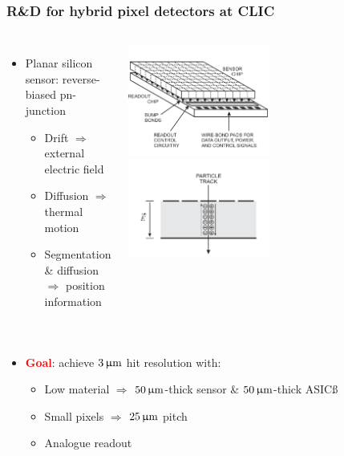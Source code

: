 \begin{frame}
  \frametitle{R\&D for hybrid pixel detectors at CLIC}


  \begin{columns}
    \begin{itemize}
    \item Planar silicon sensor: reverse-biased pn-junction
      \begin{itemize}
      \item Drift $\Rightarrow$ external electric field
      \item Diffusion $\Rightarrow$ thermal motion
      \item Segmentation \& diffusion $\Rightarrow$ position
        information
      \end{itemize}
    \end{itemize}
    \centering
    \includegraphics[width=0.5\textwidth]{figures/hybridDet.pdf}~
    \includegraphics[width=0.5\textwidth]{figures/drift_sensor.pdf}
  \end{columns}



  \begin{columns}
    \begin{itemize}
    \item \textcolor{Red}{\textbf{Goal}}: achieve $3\,\upmu\mathrm{m}$ hit resolution with:
      \begin{itemize}
      \item Low material $\Rightarrow$ $50\,\upmu\mathrm{m}$-thick sensor \& $50\,\upmu\mathrm{m}$-thick ASICß
      \item Small pixels $\Rightarrow$ $25\,\upmu\mathrm{m}$ pitch
      \item Analogue readout
      \end{itemize}
    \end{itemize}


\end{columns}
\end{frame}
